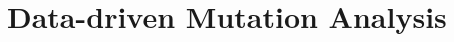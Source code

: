 \clearpage
\section{Data-driven Mutation Analysis}
\label{sec:testSuiteEvaluation:dataDriven}

\renewcommand{\APPR}{\textit{DAMAT}\xspace}



